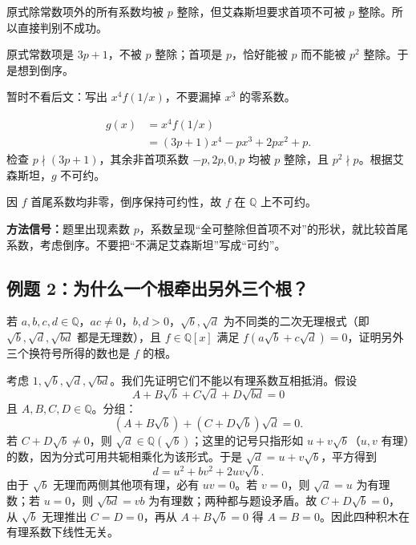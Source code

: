 \documentclass[12pt,a4paper,UTF8,fontset=none]{ctexart}
\begin{document}
 原式除常数项外的所有系数均被 $p$ 整除，但艾森斯坦要求首项不可被 $p$ 整除。所以直接判别不成功。

 原式常数项是 $3p+1$，不被 $p$ 整除；首项是 $p$，恰好能被 $p$ 而不能被 $p^2$ 整除。于是想到倒序。

\begin{trybox}
暂时不看后文：写出 $x^4f(1/x)$，不要漏掉 $x^3$ 的零系数。
\end{trybox}

\[
\begin{aligned}
g(x)&=x^4f(1/x)\\
&=(3p+1)x^4-px^3+2px^2+p.
\end{aligned}
\]
检查 $p\nmid(3p+1)$，其余非首项系数 $-p,2p,0,p$ 均被 $p$ 整除，且 $p^2\nmid p$。根据艾森斯坦，$g$ 不可约。

 因 $f$ 首尾系数均非零，倒序保持可约性，故 $f$ 在 $\mathbb Q$ 上不可约。\proofdone

\begin{takeawaybox}
\textbf{方法信号：}题里出现素数 $p$，系数呈现“全可整除但首项不对”的形状，就比较首尾系数，考虑倒序。不要把“不满足艾森斯坦”写成“可约”。
\end{takeawaybox}

\subsection{例题 2：为什么一个根牵出另外三个根？}
\begin{questionbox}[黑板例题 2]
若 $a,b,c,d\in\mathbb Q$，$ac\ne0$，$b,d>0$，$\sqrt b,\sqrt d$ 为不同类的二次无理根式（即 $\sqrt b,\sqrt d,\sqrt{bd}$ 都是无理数），且 $f\in\mathbb Q[x]$ 满足 $f(a\sqrt b+c\sqrt d)=0$，证明另外三个换符号所得的数也是 $f$ 的根。
\end{questionbox}

 考虑 $1,\sqrt b,\sqrt d,\sqrt{bd}$。我们先证明它们不能以有理系数互相抵消。假设
\[
A+B\sqrt b+C\sqrt d+D\sqrt{bd}=0
\]
且 $A,B,C,D\in\mathbb Q$。分组：
\[
(A+B\sqrt b)+(C+D\sqrt b)\sqrt d=0.
\]
若 $C+D\sqrt b\ne0$，则 $\sqrt d\in\mathbb Q(\sqrt b)$；这里的记号只指形如 $u+v\sqrt b$（$u,v$ 有理）的数，因为分式可用共轭相乘化为该形式。于是 $\sqrt d=u+v\sqrt b$，平方得到
\[
d=u^2+bv^2+2uv\sqrt b.
\]
由于 $\sqrt b$ 无理而两侧其他项有理，必有 $uv=0$。若 $v=0$，则 $\sqrt d=u$ 为有理数；若 $u=0$，则 $\sqrt{bd}=vb$ 为有理数；两种都与题设矛盾。故 $C+D\sqrt b=0$，从 $\sqrt b$ 无理推出 $C=D=0$，再从 $A+B\sqrt b=0$ 得 $A=B=0$。因此四种积木在有理系数下线性无关。
\end{document}
